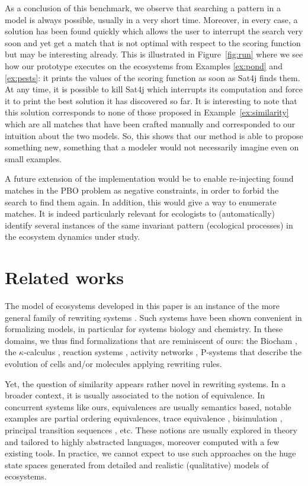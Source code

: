 \documentclass[a4paper,twoside]{article}
\begin{document}
As a conclusion of this benchmark, we observe that searching a pattern in a model is always possible, usually in a very short time.
Moreover, in every case, a solution has been found quickly which allows the user to interrupt the search very soon and yet get a match that is not optimal with respect to the scoring function but may be interesting already.
This is illustrated in Figure~\ref{fig:run} where we see how our prototype executes on the ecosystems from Examples \ref{ex:pond} and \ref{ex:pests}: it prints the values of the scoring function as soon as Sat4j finds them. At any time, it is possible to kill Sat4j which interrupts its computation and force it to print the best solution it has discovered so far.
It is interesting to note that this solution corresponds to none of those proposed in Example~\ref{ex:similarity} which are all matches that have been crafted manually and corresponded to our intuition about the two models. So, this shows that our method is able to propose something new, \ie something that a modeler would not necessarily imagine even on small examples.



A future extension of the implementation would be to enable re-injecting found matches in the PBO problem as negative constraints, in order to forbid the search to find them again. 
In addition, this would give a way to enumerate matches. %
It is indeed particularly relevant for ecologists to (automatically) identify several instances of the same invariant pattern (ecological processes) in the ecosystem dynamics under study. %

\section{Related works}
\label{sec:related}

The model of ecosystems developed in this paper is an instance of the more general family of rewriting systems \cite{Terese03}. %
Such systems have been shown convenient in formalizing models, in particular for systems biology and chemistry. 
In these domains, we thus find formalizations that are reminiscent of ours: the Biocham \cite{Fages:2008:FCB:1786698.1786702}, the $\kappa$-calculus \cite{DBLP:journals/tcs/DanosL04}, reaction systems \cite{reactionsystems}, activity networks 
\cite{toxico2017}, P-systems
\cite{DBLP:journals/ijfcs/PaunPRS11}
that describe the evolution of cells and/or molecules applying rewriting rules.


Yet, the question of similarity appears rather novel in rewriting systems. In a broader context, it is usually associated to the notion of equivalence. In concurrent systems like ours, equivalences are usually semantics based,  notable examples are partial ordering equivalences, trace equivalence \cite{vanglabbek89}, bisimulation \cite{Sangiorgi:2011:IBC:2103603}, principal transition sequences \cite{DBLP:conf/otm/WangHWWHS10}, etc.  
These notions are usually explored in theory and tailored to highly abstracted languages, moreover computed with a few existing tools. %
In practice, we cannot expect to use such approaches on the huge state spaces generated from detailed and realistic (qualitative) models of ecosystems.  %
\end{document}

